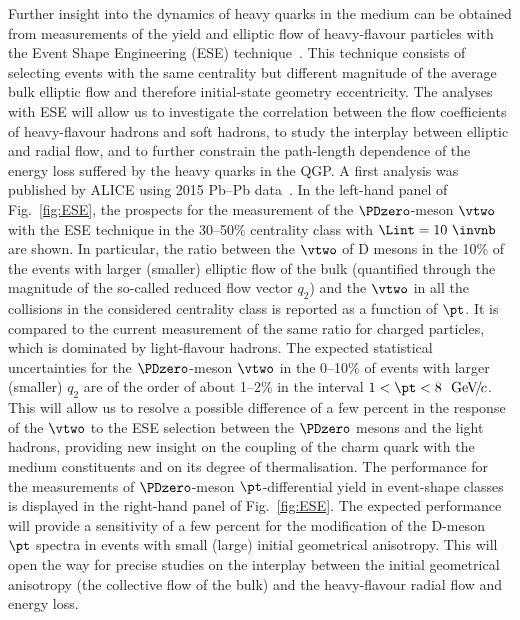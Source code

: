 Further insight into the dynamics of heavy quarks in the medium can be
obtained from measurements of the yield and elliptic flow of heavy-flavour
particles with the Event Shape Engineering (ESE) 
technique~\cite{Schukraft:2012ah}.
This technique consists of selecting events with the same centrality but 
different magnitude of the average bulk elliptic flow and therefore initial-state geometry eccentricity.
The analyses with ESE will allow us to investigate the correlation between 
the flow coefficients of heavy-flavour hadrons and soft hadrons, to study the interplay between elliptic and radial flow, and to further constrain the path-length dependence of the energy loss suffered by the heavy quarks in the QGP. A first analysis was published by ALICE using 2015 Pb--Pb data~\cite{Acharya:2018bxo}.
In the left-hand panel of Fig.~\ref{fig:ESE}, the prospects for the measurement of the ${\PDzero}$-meson $\vtwo$ with the ESE technique in the 30--50\% centrality class with $\Lint=10~\invnb$ are shown.
In particular, the ratio between the $\vtwo$ of D mesons in the 10\% of the events with larger (smaller) elliptic flow of the bulk (quantified through the magnitude of the so-called reduced flow vector $q_2$) and the $\vtwo$ in all the collisions in the considered centrality class is reported as a function of $\pt$.
It is compared to the current measurement of the same ratio for charged 
particles, which is dominated by light-flavour hadrons.
The expected statistical uncertainties for the $\PDzero$-meson $\vtwo$ in the 0--10\% of events with larger (smaller) $q_2$ are of the order of about 1--2\% in the interval $1 < \pt < 8~\UGeVc$. This will allow us to resolve a possible difference of a few percent in the response of the $\vtwo$ to the ESE selection between the $\PDzero$ mesons and the light hadrons, providing new insight on the coupling of the charm quark with the medium constituents and on its degree of thermalisation. 
The performance for the measurements of $\PDzero$-meson 
$\pt$-differential yield in event-shape classes is displayed in the right-hand panel of Fig.~\ref{fig:ESE}.
The expected performance will provide a sensitivity of a few percent for the modification of 
the D-meson $\pt$ spectra in events with small (large) initial 
geometrical anisotropy.
This will open the way for precise studies on the interplay between the initial geometrical anisotropy (the collective flow of the bulk) and the heavy-flavour radial flow and energy loss.

